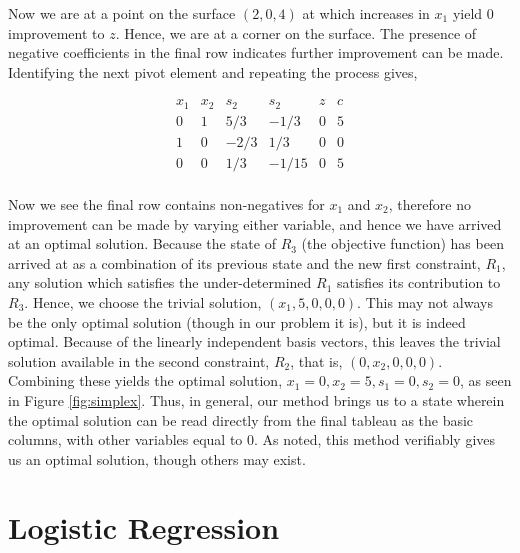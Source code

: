 \documentclass[11pt]{amsart}
\begin{document}
Now we are at a point on the surface $(2, 0, 4)$ at which increases in $x_1$ yield $0$ improvement to $z$. Hence, we are at a corner on the surface. The presence of negative coefficients in the final row indicates further improvement can be made. Identifying the next pivot element and repeating the process gives,

$$
\begin{array}{rrrrr|r}
x_1&x_2&s_2&s_2&z&c \\
\hline
0&1&5/3&-1/3&0&5\\
1&0&-2/3&1/3&0&0\\
\hline
0&0&1/3&-1/15&0&5\\
\end{array}
$$

Now we see the final row contains non-negatives for $x_1$ and $x_2$, therefore no improvement can be made by varying either variable, and hence we have arrived at an optimal solution. Because the state of $R_3$ (the objective function) has been arrived at as a combination of its previous state and the new first constraint, $R_1$, any solution which satisfies the under-determined $R_1$ satisfies its contribution to $R_3$. Hence, we choose the trivial solution, $(x_1, 5, 0, 0, 0)$. This may not always be the only optimal solution (though in our problem it is), but it is indeed optimal. Because of the linearly independent basis vectors, this leaves the trivial solution available in the second constraint, $R_2$, that is, $(0, x_2, 0, 0, 0)$. Combining these yields the optimal solution, $x_1 = 0, x_2 = 5, s_1 = 0, s_2 = 0$, as seen in Figure \ref{fig:simplex}. Thus, in general, our method brings us to a state wherein the optimal solution can be read directly from the final tableau as the basic columns, with other variables equal to 0. As noted, this method verifiably gives us an optimal solution, though others may exist.

\section{Logistic Regression}
\end{document}
